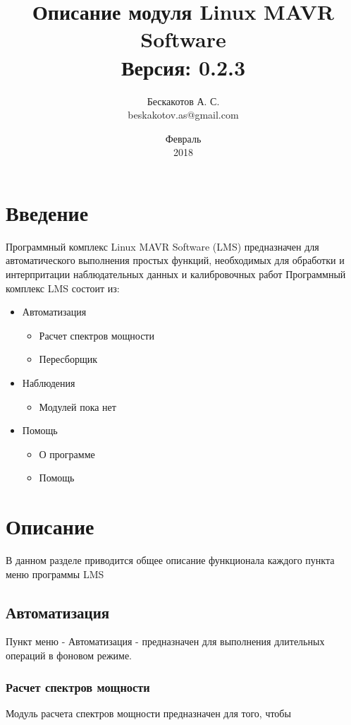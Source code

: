 \documentclass[12	pt]{article}
\begin{document}
	
\title{Описание модуля Linux MAVR Software\\ Версия: 0.2.3}
\date{Февраль\\2018}
\author{Бескакотов А. С.\\beskakotov.as@gmail.com}
\maketitle
\newpage
\tableofcontents

\newpage
\section{Введение}
Программный комплекс Linux MAVR Software (LMS) предназначен для автоматического выполнения простых функций, необходимых для обработки и интерпритации наблюдательных данных и калибровочных работ
Программный комплекс LMS состоит из:
\begin{itemize}
	\item Автоматизация
	\begin{itemize}
		\item Расчет спектров мощности
		\item Пересборщик
	\end{itemize}
	\item Наблюдения
	\begin{itemize}
		\item Модулей пока нет
	\end{itemize}
	\item Помощь
	\begin{itemize}
		\item О программе
		\item Помощь
	\end{itemize} 
\end{itemize}

\newpage
\section{Описание}

В данном разделе приводится общее описание функционала каждого пункта меню программы LMS

\subsection{Автоматизация}

Пункт меню - Автоматизация - предназначен для выполнения длительных операций в фоновом режиме.

\subsubsection{Расчет спектров мощности}

Модуль расчета спектров мощности предназначен для того, чтобы 
\end{document}
